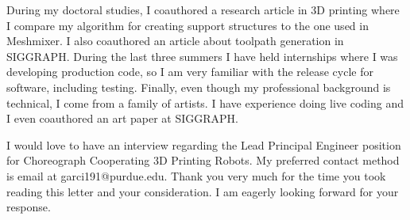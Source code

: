 \documentclass[10pt,stdletter,dateno,sigleft,letterpaper]{newlfm} %
\begin{document}
\begin{newlfm}
During my doctoral studies, I coauthored a research article in 3D printing where I compare my algorithm for creating support structures to the one used in Meshmixer. I also coauthored an article about toolpath generation in SIGGRAPH. During the last three summers I have held internships where I was developing production code, so I am very familiar with the release cycle for software, including testing. Finally, even though my professional background is technical, I come from a family of artists. I have experience doing live coding and I even coauthored an art paper at SIGGRAPH.

I would love to have an interview regarding the Lead Principal Engineer position for Choreograph Cooperating 3D Printing Robots. My preferred contact method is email at garci191@purdue.edu. Thank you very much for the time you took reading this letter and your consideration. I am eagerly looking forward for your response.


\end{newlfm}
\end{document}
